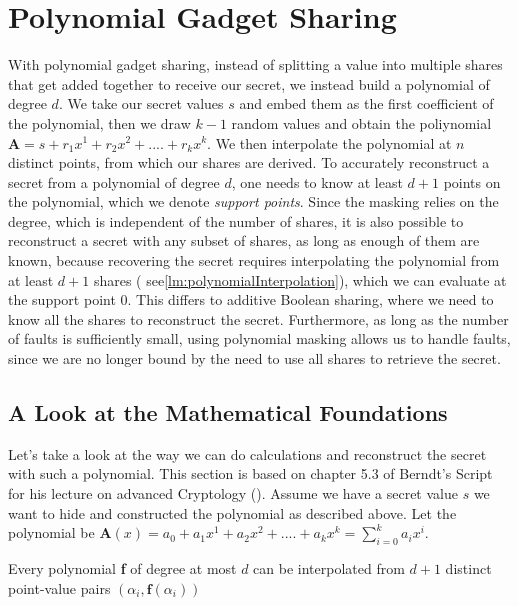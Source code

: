 \documentclass[english, version-2020-11]{uzl-thesis}
\begin{document}
    \section{Polynomial Gadget Sharing}
    With polynomial gadget sharing, instead of splitting a value into multiple shares that get added together to receive our secret, we instead build a polynomial of degree $d$. We 
    take our secret values $s$ and embed them as the first coefficient of the polynomial, then we draw $k-1$ random values and obtain the poliynomial $\mathbf{A}= s + r_1x^1+r_2 x^2 +....+r_kx^k$. We then interpolate the polynomial at $n$ distinct points, from which our shares are derived.
    To accurately reconstruct a secret from a polynomial of degree $d$, one needs to know at least $d+1$ points on the polynomial, which we denote \textit{support points}. Since the masking relies on the degree, which is independent of the number of shares, it is also possible to reconstruct a secret with any subset of shares, as long as enough of them are known, because recovering the secret requires interpolating the polynomial from at least $d+1$ shares ( see\ref{lm:polynomialInterpolation}), which we can evaluate at the support point $0$. This differs to additive Boolean sharing, where we need to know all the shares to reconstruct the secret. Furthermore, as long as the number of faults is sufficiently small, using polynomial masking allows us to handle faults, since we are no longer bound by the need to use all shares to retrieve the secret. 


    \subsection{A Look at the Mathematical Foundations}
    Let's take a look at the way we can do calculations and reconstruct the secret with such a polynomial. This section is based on chapter 5.3 of Berndt's Script for his lecture on advanced Cryptology (\cite{SkriptBerndt}). Assume we have a secret value $s$ we want to hide and constructed the polynomial as described above. Let the polynomial be  $\mathbf{A}(x)= a_0 + a_1x^1+a_2 x^2 +....+a_kx^k=\sum_{i=0}^{k}a_ix^i$. 

    \begin{lemma}\cite{BerndtBuyOneGetOneForFree}
      \label{lm:polynomialInterpolation}
    Every polynomial \textbf{f} of degree at most $d$ can be interpolated from $d+1$ distinct point-value pairs $(\alpha_i,\mathbf{f}(\alpha_i))$

    \end{lemma}
    
\end{document}
